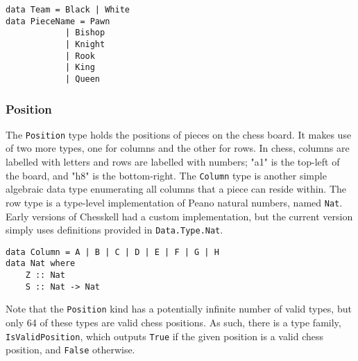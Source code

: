 \documentclass[12pt, a4paper, bibliography=totocnumbered]{scrartcl}
\begin{document}
\begin{lstlisting}
data Team = Black | White
data PieceName = Pawn
            | Bishop
            | Knight
            | Rook
            | King
            | Queen
\end{lstlisting}

\subsubsection{Position}

The \lstinline[basicstyle=\ttfamily]{Position} type holds the positions of pieces on the chess board. It makes use of two more types, one for columns and the other for rows. In chess, columns are labelled with letters and rows are labelled with numbers; "a1" is the top-left of the board, and "h8" is the bottom-right. The \lstinline[basicstyle=\ttfamily]{Column} type is another simple algebraic data type enumerating all columns that a piece can reside within. The row type is a type-level implementation of Peano natural numbers, named \lstinline[basicstyle=\ttfamily]{Nat}. Early versions of Chesskell had a custom implementation, but the current version simply uses definitions provided in \lstinline[basicstyle=\ttfamily]{Data.Type.Nat}.


\begin{lstlisting}
data Column = A | B | C | D | E | F | G | H
data Nat where
    Z :: Nat
    S :: Nat -> Nat
\end{lstlisting}

Note that the \lstinline[basicstyle=\ttfamily]{Position} kind has a potentially infinite number of valid types, but only 64 of these types are valid chess positions. As such, there is a type family, \lstinline[basicstyle=\ttfamily]{IsValidPosition}, which outputs \lstinline[basicstyle=\ttfamily]{True} if the given position is a valid chess position, and \lstinline[basicstyle=\ttfamily]{False} otherwise.

\end{document}
